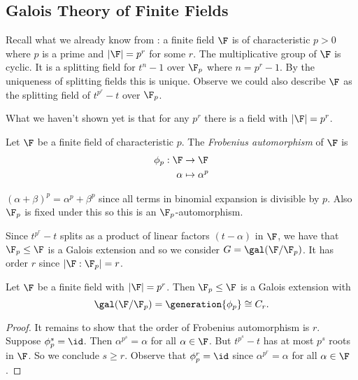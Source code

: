 \documentclass[a4paper]{article}
\begin{document}
\subsection{Galois Theory of Finite Fields}

Recall what we already know from : a finite field \(\F\) is of characteristic \(p > 0\) where \(p\) is a prime and \(|\F| = p^r\) for some \(r\). The multiplicative group of \(\F\) is cyclic. It is a splitting field for \(t^n - 1\) over \(\F_p\) where \(n = p^r - 1\). By the uniqueness of splitting fields this is unique. Observe we could also describe \(\F\) as the splitting field of \(t^{p^r} - t\) over \(\F_p\).

What we haven't shown yet is that for any \(p^r\) there is a field with \(|\F| = p^r\).

\begin{definition}
  Let \(\F\) be a finite field of characteristic \(p\). The \emph{Frobenius automorphism} of \(\F\) is
  \begin{align*}
    \phi_p: \F &\to \F \\
    \alpha &\mapsto \alpha^p
  \end{align*}
\end{definition}

\begin{remark}
  \((\alpha + \beta)^p = \alpha^p + \beta^p\) since all terms in binomial expansion is divisible by \(p\). Also \(\F_p\) is fixed under this so this is an \(\F_p\)-automorphism.
\end{remark}

Since \(t^{p^r} - t\) splits as a product of linear factors \((t - \alpha)\) in \(\F\), we have that \(\F_p \leq \F\) is a Galois extension and so we consider \(G = \gal(\F/\F_p)\). It has order \(r\) since \(|\F:\F_p| = r\).

\begin{theorem}
  Let \(\F\) be a finite field with \(|\F| = p^r\). Then \(\F_p \leq \F\) is a Galois extension with
  \[
    \gal(\F/\F_p) = \generation{\phi_p} \cong C_r.
  \]
\end{theorem}

\begin{proof}
  It remains to show that the order of Frobenius automorphism is \(r\). Suppose \(\phi_p^s = \id\). Then \(\alpha^{p^s} = \alpha\) for all \(\alpha \in \F\). But \(t^{p^s} - t\) has at most \(p^s\) roots in \(\F\). So we conclude \(s \geq r\). Observe that \(\phi_p^r = \id\) since \(\alpha^{p^r} = \alpha\) for all \(\alpha \in \F\).
\end{proof}
\end{document}
